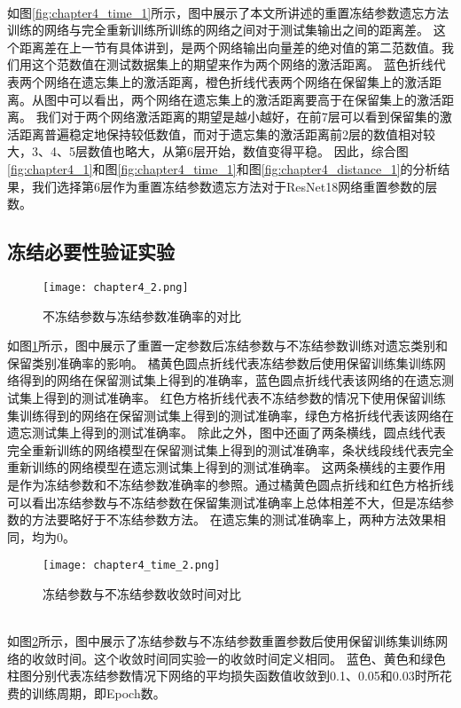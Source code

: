 \\    如图\ref{fig:chapter4_time_1}所示，图中展示了本文所讲述的重置冻结参数遗忘方法训练的网络与完全重新训练所训练的网络之间对于测试集输出之间的距离差。
这个距离差在上一节有具体讲到，是两个网络输出向量差的绝对值的第二范数值。我们用这个范数值在测试数据集上的期望来作为两个网络的激活距离。
蓝色折线代表两个网络在遗忘集上的激活距离，橙色折线代表两个网络在保留集上的激活距离。从图中可以看出，两个网络在遗忘集上的激活距离要高于在保留集上的激活距离。
我们对于两个网络激活距离的期望是越小越好，在前7层可以看到保留集的激活距离普遍稳定地保持较低数值，而对于遗忘集的激活距离前2层的数值相对较大，3、4、5层数值也略大，从第6层开始，数值变得平稳。
因此，综合图\ref{fig:chapter4_1}和图\ref{fig:chapter4_time_1}和图\ref{fig:chapter4_distance_1}的分析结果，我们选择第6层作为重置冻结参数遗忘方法对于ResNet18网络重置参数的层数。
\subsection{冻结必要性验证实验}
\begin{figure}
    \centering
    \texttt{[image: chapter4\_2.png]}
    \caption{不冻结参数与冻结参数准确率的对比}
    \label{fig:chapter4_2}
\end{figure}
如图\ref{fig:chapter4_2}所示，图中展示了重置一定参数后冻结参数与不冻结参数训练对遗忘类别和保留类别准确率的影响。
橘黄色圆点折线代表冻结参数后使用保留训练集训练网络得到的网络在保留测试集上得到的准确率，蓝色圆点折线代表该网络的在遗忘测试集上得到的测试准确率。
红色方格折线代表不冻结参数的情况下使用保留训练集训练得到的网络在保留测试集上得到的测试准确率，绿色方格折线代表该网络在遗忘测试集上得到的测试准确率。
除此之外，图中还画了两条横线，圆点线代表完全重新训练的网络模型在保留测试集上得到的测试准确率，条状线段线代表完全重新训练的网络模型在遗忘测试集上得到的测试准确率。
这两条横线的主要作用是作为冻结参数和不冻结参数准确率的参照。通过橘黄色圆点折线和红色方格折线可以看出冻结参数与不冻结参数在保留集测试准确率上总体相差不大，但是冻结参数的方法要略好于不冻结参数方法。
在遗忘集的测试准确率上，两种方法效果相同，均为0。
\begin{figure}
    \centering
    \texttt{[image: chapter4\_time\_2.png]}
    \caption{冻结参数与不冻结参数收敛时间对比}
    \label{fig:chapter4_time_2}
\end{figure}
\\如图\ref{fig:chapter4_time_2}所示，图中展示了冻结参数与不冻结参数重置参数后使用保留训练集训练网络的收敛时间。这个收敛时间同实验一的收敛时间定义相同。
蓝色、黄色和绿色柱图分别代表冻结参数情况下网络的平均损失函数值收敛到0.1、0.05和0.03时所花费的训练周期，即Epoch数。

